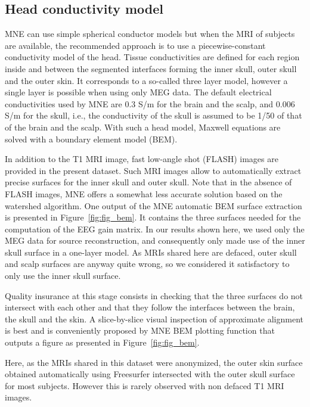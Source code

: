 \subsection{Head conductivity model}
MNE can use simple spherical conductor models but when the MRI of subjects are available, the recommended approach is to use a piecewise-constant conductivity model of the head. Tissue conductivities are defined for each region inside and between the segmented interfaces forming the inner skull, outer skull and the outer skin. It corresponds to a so-called three layer model, however a single layer is possible when using only MEG data. The default electrical conductivities used by MNE are 0.3 S/m for the brain and the scalp, and 0.006 S/m for the skull, i.e., the conductivity of the skull is assumed to be 1/50 of that of the brain and the scalp. With such a head model, Maxwell equations are solved with a boundary element model (BEM).

In addition to the T1 MRI image, fast low-angle shot (FLASH) images are provided in the present dataset. Such MRI images allow to automatically extract precise surfaces for the inner skull and outer skull. Note that in the absence of FLASH images, MNE offers a somewhat less accurate solution based on the watershed algorithm. One output of the MNE automatic BEM surface extraction is presented in Figure~\ref{fig:fig_bem}. It contains the three surfaces needed for the computation of the EEG gain matrix. In our results shown here, we used only the MEG data for source reconstruction, and consequently only made use of the inner skull surface in a one-layer model. As MRIs shared here are defaced, outer skull and scalp surfaces are anyway quite wrong, so we considered it satisfactory to only use the inner skull surface.

Quality insurance at this stage consists in checking that the three surfaces do not intersect with each other and that they follow the interfaces between the brain, the skull and the skin. A slice-by-slice visual inspection of approximate alignment is best and is conveniently proposed by MNE BEM plotting function that outputs a figure as presented in Figure~\ref{fig:fig_bem}.

Here, as the MRIs shared in this dataset were anonymized, the outer skin surface obtained automatically using Freesurfer intersected with the outer skull surface for most subjects. However this is  rarely observed with non defaced T1 MRI images.

